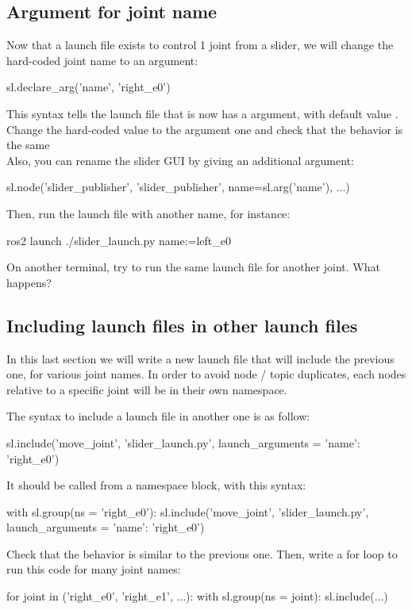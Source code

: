 \documentclass{ecnreport}
\begin{document}
\subsection{Argument for joint name}

Now that a launch file exists to control 1 joint from a slider, we will change the hard-coded joint name to an argument:
\begin{pythoncodelarge}
sl.declare_arg('name', 'right_e0')
\end{pythoncodelarge}
This syntax tells the launch file that is now has a  argument, with default value .\\

Change the hard-coded value to the argument one  and check that the behavior is the same\\

Also, you can rename the slider GUI by giving an additional argument:
\begin{pythoncodelarge}
sl.node('slider_publisher', 'slider_publisher', name=sl.arg('name'), ...)
\end{pythoncodelarge}

Then, run the launch file with another name, for instance:
\begin{bashcodelarge}
 ros2 launch ./slider_launch.py name:=left_e0
\end{bashcodelarge}
On another terminal, try to run the same launch file for another joint. What happens?\\



\subsection{Including launch files in other launch files}

In this last section we will write a new launch file that will include the previous one, for various joint names. In order to avoid node / topic duplicates, each nodes relative to a specific joint will be in their own namespace. 

The syntax to include a launch file in another one is as follow:
\begin{pythoncodelarge}
sl.include('move_joint', 'slider_launch.py', launch_arguments = {'name': 'right_e0'})
\end{pythoncodelarge}

It should be called from a namespace block, with this syntax:
\begin{pythoncodelarge}
with sl.group(ns = 'right_e0'):
  sl.include('move_joint', 'slider_launch.py', launch_arguments = {'name': 'right_e0'})
\end{pythoncodelarge}

Check that the behavior is similar to the previous one. Then, write a for loop to run this code for many joint names:
\begin{pythoncodelarge}
for joint in ('right_e0', 'right_e1', ...):
    with sl.group(ns = joint):
        sl.include(...)
\end{pythoncodelarge}
\end{document}

